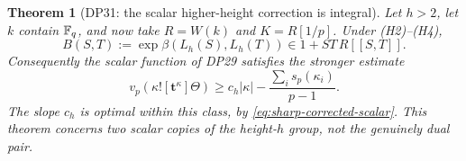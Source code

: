 \documentclass[11pt,a4paper]{article}
\newtheorem{theorem}{Theorem}[section]
\theoremstyle{definition}\newtheorem{remark}[theorem]{Remark}
\begin{document}
\begin{theorem}[DP31: the scalar higher-height correction is integral]\label{DP31}
Let $h>2$, let $k$ contain $\mathbb F_q$, and now take $R=W(k)$ and $K=R[1/p]$. Under (H2)--(H4),
\begin{equation}\label{eq:scalar-gauge}
 B(S,T):=\exp\beta(L_h(S),L_h(T))\in1+ST\,R[[S,T]].
\end{equation}
Consequently the scalar function of DP29 satisfies the stronger estimate
\begin{equation}\label{eq:scalar-full-slope}
 v_p(\kappa![\mathbf t^\kappa]\Theta)
 \ge c_h|\kappa|-\frac{\sum_i s_p(\kappa_i)}{p-1}.
\end{equation}
The slope $c_h$ is optimal within this class, by \eqref{eq:sharp-corrected-scalar}. This theorem concerns two scalar copies of the height-$h$ group, not the genuinely dual pair.
\end{theorem}
\end{document}
